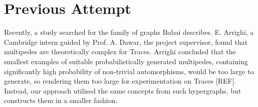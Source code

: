 \section{Previous Attempt}
Recently, a study searched for the family of graphs Babai describes. E. Arrighi, a Cambridge intern guided by Prof. A. Dawar, the project supervisor, found that multipedes are theoretically complex for Traces. Arrighi concluded that the smallest examples of suitable probabilistically generated multipedes, containing significantly high probability of non-trivial automorphisms, would be too large to generate, so rendering them too large for experimentation on Traces [REF]. Instead, our approach utilised the same concepts from such hypergraphs, but constructs them in a smaller fashion.







